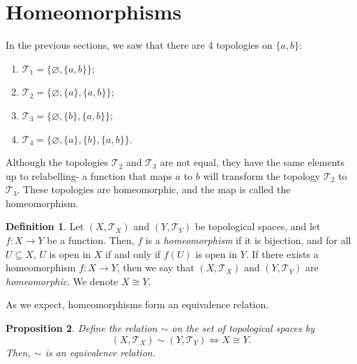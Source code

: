\documentclass[a4paper, openany]{memoir}
\theoremstyle{definition}
\newtheorem{definition}{Definition}[section]
\theoremstyle{plain}
\newtheorem{proposition}[definition]{Proposition}
\begin{document}
\section{Homeomorphisms}
In the previous sections, we saw that there are 4 topologies on $\{a, b\}$:
\begin{enumerate}
    \item $\mathcal{T}_1 = \{\varnothing, \{a, b\}\}$;
    \item $\mathcal{T}_2 = \{\varnothing, \{a\}, \{a, b\}\}$;
    \item $\mathcal{T}_3 = \{\varnothing, \{b\}, \{a, b\}\}$;
    \item $\mathcal{T}_4 = \{\varnothing, \{a\}, \{b\}, \{a, b\}\}$.
\end{enumerate}
Although the topologies $\mathcal{T}_2$ and $\mathcal{T}_3$ are not equal, they have the same elements up to relabelling- a function that maps $a$ to $b$ will transform the topology $\mathcal{T}_2$ to $\mathcal{T}_3$. These topologies are homeomorphic, and the map is called the homeomorphism.
\begin{definition}
Let $(X, \mathcal{T}_X)$ and $(Y, \mathcal{T}_Y)$ be topological spaces, and let $f: X \to Y$ be a function. Then, $f$ is a \emph{homeomorphism} if  it is bijection, and for all $U \subseteq X$, $U$ is open in $X$ if and only if $f(U)$ is open in $Y$. If there exists a homeomorphism $f: X \to Y$, then we say that $(X, \mathcal{T}_X)$ and $(Y, \mathcal{T}_Y)$ are \emph{homeomorphic}. We denote $X \cong Y$.
\end{definition}
\noindent As we expect, homeomorphisms form an equivalence relation.
\begin{proposition}
Define the relation $\sim$ on the set of topological spaces by
\[(X, \mathcal{T}_X) \sim (Y, \mathcal{T}_Y) \iff X \cong Y.\]
Then, $\sim$ is an equivalence relation.
\end{proposition}
\end{document}
